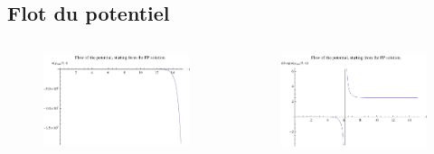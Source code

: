 \documentclass[xcolor=dvipsnames]{beamer}
\begin{document}
\subsection{Flot du potentiel}
\begin{frame}



\begin{columns}

\begin{column}{6cm}
\begin{figure}[htp]
\centering
\includegraphics[scale=0.45]{img/plotflowd3.pdf}
\label{}
\end{figure}
\end{column}

\begin{column}{6cm}
\begin{figure}[htp]
\centering
\includegraphics[scale=0.45]{img/plotlogflowd3.pdf}
\label{}
\end{figure}
\end{column}


\end{columns}
\end{frame}
\end{document}
